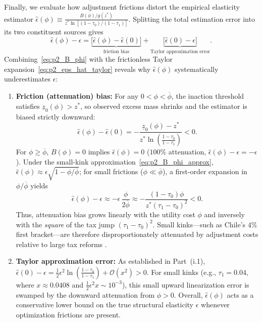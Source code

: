 Finally, we evaluate how adjustment frictions distort the empirical elasticity estimator $\hat{\epsilon}(\phi) \equiv \frac{B(\phi)/g(z^*)}{z^*\ln[(1-\tau_0)/(1-\tau_1)]}$. Splitting the total estimation error into its two constituent sources gives
\begin{equation}
\hat{\epsilon}(\phi) - \epsilon
= \underbrace{\big[\hat{\epsilon}(\phi) - \hat{\epsilon}(0)\big]}_{\text{friction bias}}
+ \underbrace{\big[\hat{\epsilon}(0) - \epsilon\big]}_{\text{Taylor approximation error}}.
\label{eq:p2_bias_decomp}
\end{equation}
Combining~\eqref{eq:p2_B_phi} with the frictionless Taylor expansion~\eqref{eq:p2_eps_hat_taylor} reveals why $\hat{\epsilon}(\phi)$ systematically underestimates $\epsilon$:
\begin{enumerate}
    \item \textbf{Friction (attenuation) bias:} For any $0 < \phi < \overline{\phi}$, the inaction threshold satisfies $\underline{z}_0(\phi) > z^*$, so observed excess mass shrinks and the estimator is biased strictly downward:
    \begin{equation}
    \hat{\epsilon}(\phi) - \hat{\epsilon}(0)
    = -\frac{\underline{z}_0(\phi) - z^*}{z^*\ln\!\left(\frac{1-\tau_0}{1-\tau_1}\right)} < 0.
    \label{eq:p2_attenuation_exact}
    \end{equation}
    For $\phi \ge \overline{\phi}$, $B(\phi) = 0$ implies $\hat{\epsilon}(\phi) = 0$ ($100\%$ attenuation, $\hat{\epsilon}(\phi) - \epsilon = -\epsilon$). Under the small-kink approximation~\eqref{eq:p2_B_phi_approx}, $\hat{\epsilon}(\phi) \approx \epsilon\sqrt{1 - \phi/\overline{\phi}}$; for small frictions ($\phi \ll \overline{\phi}$), a first-order expansion in $\phi/\overline{\phi}$ yields
    \begin{equation}
    \hat{\epsilon}(\phi) - \epsilon \approx -\epsilon\,\frac{\phi}{2\overline{\phi}} \approx -\frac{(1-\tau_0)\phi}{z^*(\tau_1 - \tau_0)^2} < 0.
    \end{equation}
    Thus, attenuation bias grows linearly with the utility cost $\phi$ and inversely with the \emph{square} of the tax jump $(\tau_1 - \tau_0)^2$. Small kinks---such as Chile's $4\%$ first bracket---are therefore disproportionately attenuated by adjustment costs relative to large tax reforms \parencite{chetty2011adjustment}.
    \item \textbf{Taylor approximation error:} As established in Part~(i.1), $\hat{\epsilon}(0) - \epsilon = \frac{1}{2}\epsilon^2\ln\!\left(\frac{1-\tau_0}{1-\tau_1}\right) + \mathcal{O}(x^2) > 0$. For small kinks (e.g., $\tau_1 = 0.04$, where $x \approx 0.0408$ and $\frac{1}{2}\epsilon^2 x \sim 10^{-3}$), this small upward linearization error is swamped by the downward attenuation from $\phi > 0$. Overall, $\hat{\epsilon}(\phi)$ acts as a conservative lower bound on the true structural elasticity $\epsilon$ whenever optimization frictions are present.
\end{enumerate}

